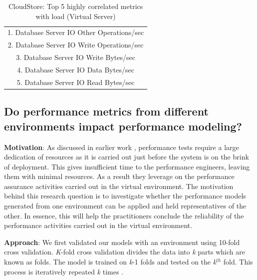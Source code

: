 \begin{table}[thb!]
	\begin{center}
		\caption{CloudStore: Top 5 highly correlated metrics with load (Virtual Server)}
		\label{resultRQ3}
		\begin{tabular}{c}
			\toprule
			1. Database Server IO Other Operations/sec  \\
			2. Database Server IO Write Operations/sec   \\
			3. Database Server IO Write Bytes/sec \\
			4. Database Server IO Data Bytes/sec    \\
			5. Database Server IO Read Bytes/sec \\
			\bottomrule             
		\end{tabular}
	\end{center}
\end{table}


\subsection{\textbf{Do performance metrics from different environments impact performance modeling?}}

\textbf{Motivation}: As discussed in earlier work \cite{Shang:2015:ADP:2668930.2688052} \cite{Nguyen:2012:ADP:2188286.2188344}, performance tests require a large dedication of resources as it is carried out just before the system is on the brink of deployment. This gives insufficient time to the performance engineers, leaving them with minimal resources. As a result they leverage on the performance assurance activities carried out in the virtual environment. The motivation behind this research question is to investigate whether the performance models generated from one environment can be applied and held representatives of the other. In essence, this will help the practitioners conclude the reliability of the performance activities carried out in the virtual environment. 

\textbf{Approach}: We first validated our models with an environment using 10-fold cross validation. \textit{K}-fold cross validation divides the data into \textit{k} parts which are known as folds. The model is trained on \textit{k}-1 folds and tested on the \textit{k}$^{th}$ fold. This process is iteratively repeated \textit{k} times \cite{10foldcross} \cite{kohavi1995study}.



